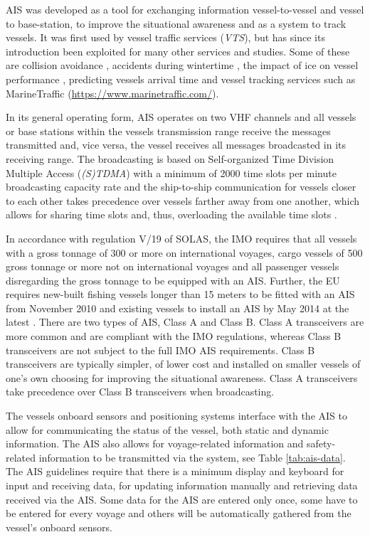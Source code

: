 \documentclass[../main.tex]{subfiles}
\begin{document}
AIS was developed as a tool for exchanging information vessel-to-vessel and vessel to base-station, to improve the situational awareness and as a system to track vessels. It was first used by vessel traffic services (\textit{VTS}), but has since its introduction been exploited for many other services and studies. Some of these are collision avoidance \cite{Mou_2010}, accidents during wintertime \cite{Goerlandt_2017}, the impact of ice on vessel performance \cite{Montewka_2015}, predicting vessels arrival time \cite{Jahn_2018, Alessandrini_2019, El_2020, Veenstra_2021, real-eta} and vessel tracking services such as MarineTraffic (\url{https://www.marinetraffic.com/}).

In its general operating form, AIS operates on two VHF channels and all vessels or base stations within the vessels transmission range receive the messages transmitted and, vice versa, the vessel receives all messages broadcasted in its receiving range. The broadcasting is based on Self-organized Time Division Multiple Access (\textit{(S)TDMA}) with a minimum of 2000 time slots per minute broadcasting capacity rate and the ship-to-ship communication for vessels closer to each other takes precedence over vessels farther away from one another, which allows for sharing time slots and, thus, overloading the available time slots \cite{IMO_2015}.

In accordance with regulation V/19 of SOLAS, the IMO requires that all vessels with a gross tonnage of 300 or more on international voyages, cargo vessels of 500 gross tonnage or more not on international voyages and all passenger vessels disregarding the gross tonnage to be equipped with an AIS. Further, the EU requires new-built fishing vessels longer than 15 meters to be fitted with an AIS from November 2010 and existing vessels to install an AIS by May 2014 at the latest \cite{EU_2011}. There are two types of AIS, Class A and Class B. Class A transceivers are more common and are compliant with the IMO regulations, whereas Class B transceivers are not subject to the full IMO AIS requirements. Class B transceivers are typically simpler, of lower cost and installed on smaller vessels of one's own choosing for improving the situational awareness. Class A transceivers take precedence over Class B transceivers when broadcasting.

The vessels onboard sensors and positioning systems interface with the AIS to allow for communicating the status of the vessel, both static and dynamic information. The AIS also allows for voyage-related information and safety-related information to be transmitted via the system, see Table \ref{tab:ais-data}. The AIS guidelines require that there is a minimum display and keyboard for input and receiving data, for updating information manually and retrieving data received via the AIS. Some data for the AIS are entered only once, some have to be entered for every voyage and others will be automatically gathered from the vessel's onboard sensors.
\end{document}
